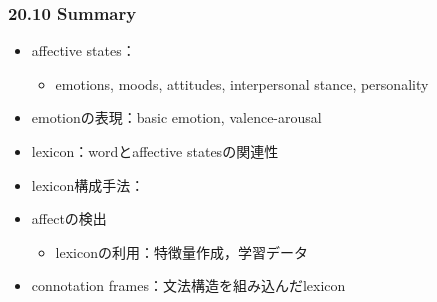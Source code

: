 
\begin{frame}
    \frametitle{20.10 Summary}
    \begin{itemize}
        \item affective states：
        \begin{itemize}
            \item emotions, moods, attitudes, interpersonal stance, personality
        \end{itemize}
        \item emotionの表現：basic emotion, valence-arousal
    \end{itemize}
    \begin{itemize}
        \item lexicon：wordとaffective statesの関連性
        \item lexicon構成手法：
    \end{itemize}
    \begin{itemize}
        \item affectの検出
        \begin{itemize}
            \item lexiconの利用：特徴量作成，学習データ
        \end{itemize}
    \end{itemize}
    \begin{itemize}
        \item connotation frames：文法構造を組み込んだlexicon
    \end{itemize}
\end{frame}
